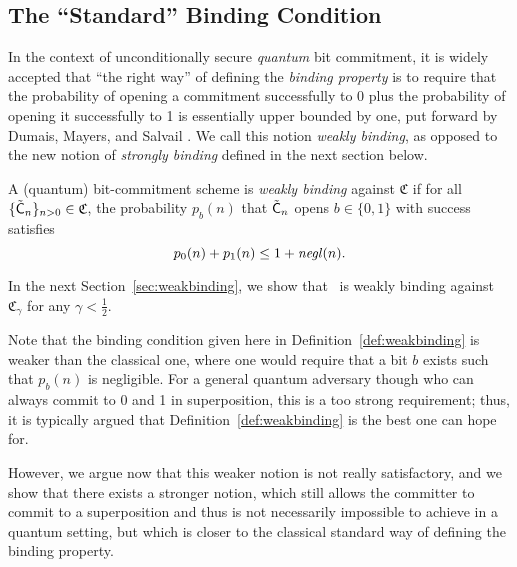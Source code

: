 \subsection{The ``Standard'' Binding Condition}
In the context of unconditionally secure \emph{quantum} bit
commitment, it is widely accepted that ``the right way'' of defining
the \emph{binding property} is to require that the probability of
opening a commitment successfully to 0 plus the probability of opening
it successfully to 1 is essentially upper bounded by one, put forward by
Dumais, Mayers, and Salvail \cite{DMS00}. We call this notion
\emph{weakly binding}, as opposed to the new notion of \emph{strongly
  binding} defined in the next section below.
\begin{definition} \label{def:weakbinding}
  A (quantum) bit-commitment scheme is \emph{weakly binding}
  against $\mathfrak{C}$ if for all $\{\tilde{\sf C}_n\}_{n>0}\in \mathfrak{C}$,
  the probability $p_b(n)$ that $\tilde{\sf C}_n$ opens $b\in\{0,1\}$ with
  success satisfies
\[ p_0(n)+p_1(n) \leq 1+\mathit{negl}({n}).
\] 
\end{definition} 
In the next Section~\ref{sec:weakbinding}, we show that \eprcomm\ is
weakly binding against $\mathfrak{C}_{\gamma}$ for any
$\gamma<\frac{1}{2}$.

Note that the binding condition given here in
Definition~\ref{def:weakbinding} is weaker than the classical one,
where one would require that a bit $b$ exists such that $p_b(n)$ is
negligible.  For a general quantum adversary though who can always
commit to 0 and 1 in superposition, this is a too strong requirement;
thus, it is typically argued that Definition~\ref{def:weakbinding} is the best
one can hope for. 

However, we argue now that this weaker notion is not really
satisfactory, and we show that there exists a stronger notion, which
still allows the committer to commit to a superposition and thus is
not necessarily impossible to achieve in a quantum setting, but which
is closer to the classical standard way of defining the
binding property. 

